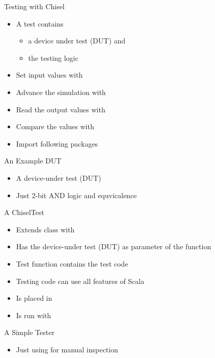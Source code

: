 \begin{frame}[fragile]{Testing with Chisel}
\begin{itemize}
\item A test contains
\begin{itemize}
\item a device under test (DUT) and
\item the testing logic
\end{itemize}
\item Set input values with 
\item Advance the simulation with 
\item Read the output values with 
\item Compare the values with 
\item Import following packages
\end{itemize}
\end{frame}

\begin{frame}[fragile]{An Example DUT}
\begin{itemize}
\item A device-under test (DUT)
\item Just 2-bit AND logic and equvicalence
\end{itemize}
\end{frame}

\begin{frame}[fragile]{A ChiselTest}
\begin{itemize}
\item Extends class  with 
\item Has the device-under test (DUT) as parameter of the  function
\item Test function contains the test code
\item Testing code can use all features of Scala
\item Is placed in 
\item Is run with 
\end{itemize}
\end{frame}

\begin{frame}[fragile]{A Simple Tester}
\begin{itemize}
\item Just using  for manual inspection
\end{itemize}
\end{frame}


